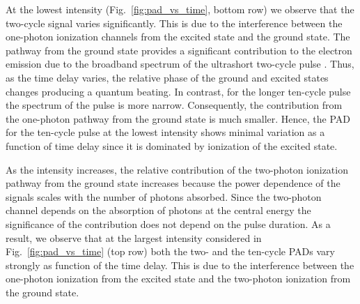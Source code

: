 At the lowest intensity (Fig.~\ref{fig:pad_vs_time}, bottom row) we observe that the two-cycle signal varies significantly. This is due to the interference between the one-photon ionization channels from the excited state and the ground state. The pathway from the ground state provides a significant contribution to the electron emission due to the broadband spectrum of the ultrashort two-cycle pulse \cite{venzke2020_ionization,venzke2020_GAP}. Thus, as the time delay varies, the relative phase of the ground and excited states changes producing a quantum beating. In contrast, for the longer ten-cycle pulse the spectrum of the pulse is more narrow. Consequently, the contribution from the one-photon pathway from the ground state is much smaller. Hence, the PAD for the ten-cycle pulse at the lowest intensity shows minimal variation as a function of time delay since it is dominated by ionization of the excited state. 

As the intensity increases, the relative contribution of the two-photon ionization pathway from the ground state increases because the power dependence of the signals scales with the number of photons absorbed. Since the two-photon channel depends on the absorption of photons at the central energy the significance of the contribution does not depend on the pulse duration. As a result, we observe that at the largest intensity considered in Fig.~\ref{fig:pad_vs_time} (top row) both the two- and the ten-cycle PADs vary strongly as function of the time delay. This is due to the interference between the one-photon ionization from the excited state and the two-photon ionization from the ground state.

